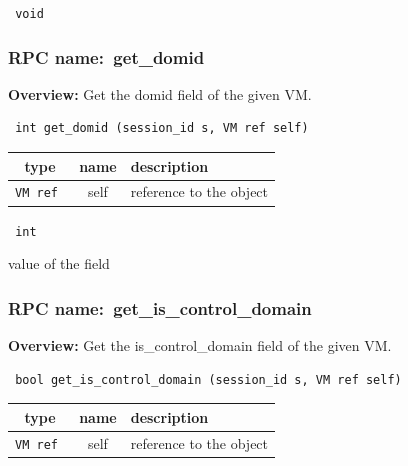 {\tt 
void
}



\vspace{0.3cm}
\vspace{0.3cm}
\vspace{0.3cm}
\subsubsection{RPC name:~get\_domid}

{\bf Overview:} 
Get the domid field of the given VM.

\begin{verbatim} int get_domid (session_id s, VM ref self)\end{verbatim}



 
\vspace{0.3cm}
\begin{tabular}{|c|c|p{7cm}|}
 \hline
{\bf type} & {\bf name} & {\bf description} \\ \hline
{\tt VM ref } & self & reference to the object \\ \hline 

\end{tabular}

\vspace{0.3cm}

{\tt 
int
}


value of the field
\vspace{0.3cm}
\vspace{0.3cm}
\vspace{0.3cm}
\subsubsection{RPC name:~get\_is\_control\_domain}

{\bf Overview:} 
Get the is\_control\_domain field of the given VM.

\begin{verbatim} bool get_is_control_domain (session_id s, VM ref self)\end{verbatim}



 
\vspace{0.3cm}
\begin{tabular}{|c|c|p{7cm}|}
 \hline
{\bf type} & {\bf name} & {\bf description} \\ \hline
{\tt VM ref } & self & reference to the object \\ \hline 

\end{tabular}

